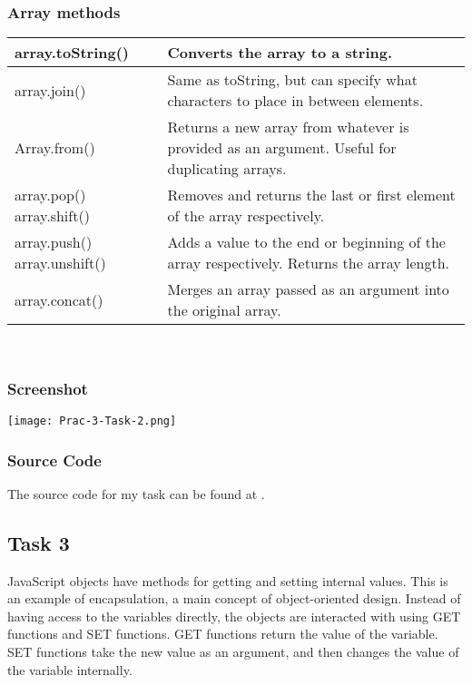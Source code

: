 \documentclass[portfolio.tex]{subfiles}
\begin{document}
				\subsubsection{Array methods}
				\begin{tabular}{|P{4cm}|p{12cm}|}
					\hline
					array.toString() & Converts the array to a string. \\
					\hline
					array.join() & Same as toString, but can specify what characters to place in between elements.  \\
					\hline
					Array.from() & Returns a new array from whatever is provided as an argument. Useful for duplicating arrays.  \\
					\hline
					array.pop()  \newline array.shift() & Removes and returns the last or first element of the array respectively.  \\
					\hline
					array.push() \newline array.unshift() & Adds a value to the end or beginning of the array respectively. Returns the array length. \\
					\hline
					array.concat() &  Merges an array passed as an argument into the original array.  \\
					\hline
				\end{tabular}
				\autocite{array-methods}\\

				\subsubsection{Screenshot}
				\begin{center}
				 	\texttt{[image: Prac-3-Task-2.png]}
				\end{center}


			 	\subsubsection{Source Code}
				The source code for my task can be found at .

			\subsection{Task 3}
				JavaScript objects have methods for getting and setting internal values. This is an example of encapsulation, a main concept of object-oriented design. Instead of having access to the variables directly, the objects are interacted with using GET functions and SET functions. GET functions return the value of the variable. SET functions take the new value as an argument, and then changes the value of the variable internally. \\
\end{document}

